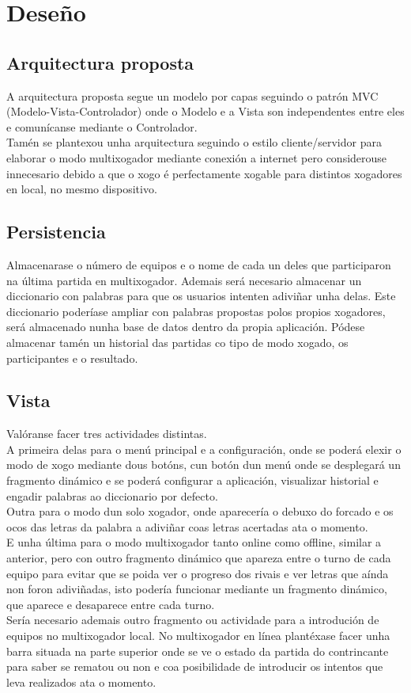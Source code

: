 \chapter{Deseño}
\label{chap:deseño}
\section {Arquitectura proposta}
A arquitectura proposta segue un modelo por capas seguindo o patrón MVC (Modelo-Vista-Controlador) onde o Modelo e a Vista son independentes entre eles e comunícanse mediante o Controlador.\\

Tamén se plantexou unha arquitectura seguindo o estilo cliente/servidor para elaborar o modo multixogador mediante conexión a internet pero considerouse innecesario debido a que o xogo é perfectamente xogable para distintos xogadores en local, no mesmo dispositivo.


\section {Persistencia}
Almacenarase o número de equipos e o nome de cada un deles que participaron na última partida en multixogador.
Ademais será necesario almacenar un diccionario con palabras para que os usuarios intenten adiviñar unha delas. Este diccionario poderíase ampliar con palabras propostas polos propios xogadores, será almacenado nunha base de datos dentro da propia aplicación.
Pódese almacenar tamén un historial das partidas co tipo de modo xogado, os participantes e o resultado.

\section {Vista}
Valóranse facer tres actividades distintas.\\
A primeira delas para o menú principal e a configuración, onde se poderá elexir o modo de xogo mediante dous botóns, cun botón dun menú onde se desplegará un fragmento dinámico e se poderá configurar a aplicación, visualizar historial e engadir palabras ao diccionario por defecto.\\

Outra para o modo dun solo xogador, onde aparecería o debuxo do forcado e os ocos das letras da palabra a adiviñar coas letras acertadas ata o momento.\\

E unha última para o modo multixogador tanto online como offline, similar a anterior, pero con outro fragmento dinámico que apareza entre o turno de cada equipo para evitar que se poida ver o progreso dos rivais e ver letras que aínda non foron adiviñadas, isto podería funcionar mediante un fragmento dinámico, que aparece e desaparece entre cada turno.\\
Sería necesario ademais outro fragmento ou actividade para a introdución de equipos no multixogador local.
No multixogador en línea plantéxase facer unha barra situada na parte superior onde se ve o estado da partida do contrincante para saber se rematou ou non e coa posibilidade de introducir os intentos que leva realizados ata o momento.

